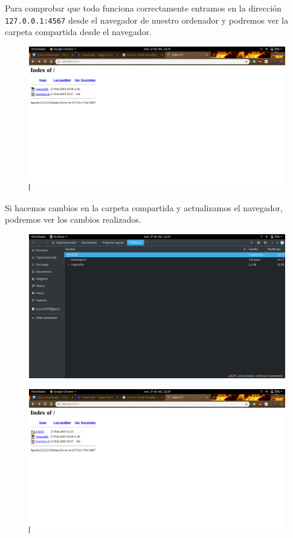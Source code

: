 \documentclass[12pt,letterpaper]{article}
\begin{document}
Para comprobar que todo funciona correctamente entramos en la dirección \texttt{127.0.0.1:4567} desde el navegador de nuestro ordenador y podremos ver la carpeta compartida desde el navegador.
\begin{figure}[h]
	\centering
	\includegraphics[scale=0.3]{Carpeta1.png}
\end{figure}
\newpage
Si hacemos cambios en la carpeta compartida y actualizamos el navegador, podremos ver los cambios realizados.
\begin{figure}[h]
	\centering
	\includegraphics[scale=0.3]{Carpeta2.png}
\end{figure}
\begin{figure}[h]
	\centering
	\includegraphics[scale=0.3]{Carpeta3.png}
\end{figure}
\end{document}
